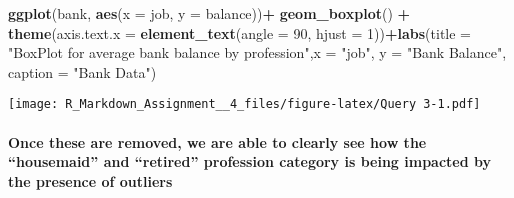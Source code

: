 \documentclass[]{article}
\newenvironment{Shaded}{\begin{snugshade}}{\end{snugshade}}
\newcommand{\KeywordTok}[1]{\textcolor[rgb]{0.13,0.29,0.53}{\textbf{#1}}}
\newcommand{\DataTypeTok}[1]{\textcolor[rgb]{0.13,0.29,0.53}{#1}}
\newcommand{\DecValTok}[1]{\textcolor[rgb]{0.00,0.00,0.81}{#1}}
\newcommand{\StringTok}[1]{\textcolor[rgb]{0.31,0.60,0.02}{#1}}
\newcommand{\OperatorTok}[1]{\textcolor[rgb]{0.81,0.36,0.00}{\textbf{#1}}}
\newcommand{\NormalTok}[1]{#1}
\let\oldparagraph\paragraph
\renewcommand{\paragraph}[1]{\oldparagraph{#1}\mbox{}}
\begin{document}
\begin{Shaded}
\begin{Highlighting}[]
\KeywordTok{ggplot}\NormalTok{(bank, }\KeywordTok{aes}\NormalTok{(}\DataTypeTok{x =}\NormalTok{ job, }\DataTypeTok{y =}\NormalTok{ balance))}\OperatorTok{+}\StringTok{ }\KeywordTok{geom_boxplot}\NormalTok{() }\OperatorTok{+}\StringTok{ }\KeywordTok{theme}\NormalTok{(}\DataTypeTok{axis.text.x =} \KeywordTok{element_text}\NormalTok{(}\DataTypeTok{angle =} \DecValTok{90}\NormalTok{, }\DataTypeTok{hjust =} \DecValTok{1}\NormalTok{))}\OperatorTok{+}\KeywordTok{labs}\NormalTok{(}\DataTypeTok{title =} \StringTok{"BoxPlot for average bank balance by profession"}\NormalTok{,}\DataTypeTok{x =} \StringTok{"job"}\NormalTok{, }\DataTypeTok{y =} \StringTok{"Bank Balance"}\NormalTok{,}
\DataTypeTok{caption =} \StringTok{"Bank Data"}\NormalTok{) }
\end{Highlighting}
\end{Shaded}

\texttt{[image: R\_Markdown\_Assignment\_\_4\_files/figure-latex/Query 3-1.pdf]}

\paragraph{\texorpdfstring{Once these are removed, we are able to
clearly see how the ``housemaid'' and ``retired'' profession category is
being impacted by the presence of
outliers}{Once these are removed, we are able to clearly see how the housemaid and retired profession category is being impacted by the presence of outliers}}\label{once-these-are-removed-we-are-able-to-clearly-see-how-the-housemaid-and-retired-profession-category-is-being-impacted-by-the-presence-of-outliers}
\end{document}
